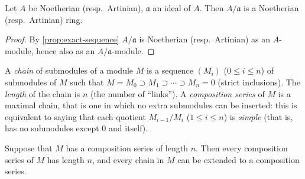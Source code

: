 \begin{proposition}\label{prop:quotient-ring}
    Let $A$ be Noetherian (resp.\ Artinian), $\mathfrak{a}$ an ideal of $A$. Then $A/\mathfrak{a}$ is a Noetherian (resp.\ Artinian) ring.
\end{proposition}
\begin{proof}
    By \eqref{prop:exact-sequence} $A/\mathfrak{a}$ is Noetherian (resp.\ Artinian) as an $A$-module, hence also as an $A/\mathfrak{a}$-module.
\end{proof}

A \emph{chain} of submodules  of a module $M$ is a sequence $(M_i)$ ($0 \leq i \leq n$) of submodules of $M$ such that $M = M_0 \supset M_1 \supset \cdots \supset M_n = 0$ (strict inclusions). The \emph{length} of the chain is $n$ (the number of ``links''). A \emph{composition series} of $M$ is a maximal chain, that is one in which no extra submodules can be inserted: this is equivalent to saying that each quotient $M_{i-1}/M_i$ ($1 \leq i \leq n$) is \emph{simple} (that is, has no submodules except $0$ and itself).

\begin{proposition}\label{prop:composition-series}
Suppose that $M$ has a composition series of length $n$. Then every composition series of $M$ has length $n$, and every chain in $M$ can be extended to a composition series.
\end{proposition}

